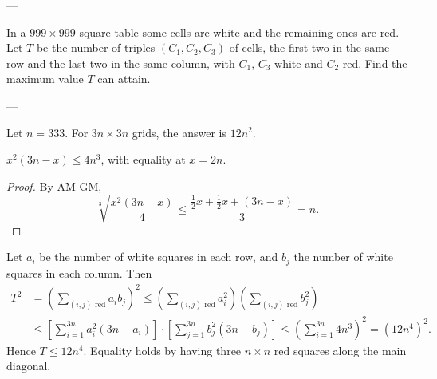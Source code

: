 
---

In a $999\times999$ square table some cells are white and the remaining ones are red. Let $T$ be the number of triples $(C_1,C_2,C_3)$ of cells, the first two in the same row and the last two in the same column, with $C_1$, $C_3$ white and $C_2$ red. Find the maximum value $T$ can attain.

---

Let $n=333$. For $3n\times3n$ grids, the answer is $12n^2$.
\begin{lemma*}
    $x^2(3n-x)\le4n^3$, with equality at $x=2n$.
\end{lemma*}
\begin{proof}
    By AM-GM,
    \[\sqrt[3]{\frac{x^2(3n-x)}4}\le\frac{\frac12x+\frac12x+(3n-x)}3=n.\]
\end{proof}

Let $a_i$ be the number of white squares in each row, and $b_j$ the number of white squares in each column.  Then
\begin{align*}
    T^2&=\left(\sum_{(i,j)\text{ red}}a_ib_j\right)^2
    \le\left(\sum_{(i,j)\text{ red}}a_i^2\right)\left(\sum_{(i,j)\text{ red}}b_j^2\right)\\
    &\le\left[\sum_{i=1}^{3n}a_i^2(3n-a_i)\right]\cdot\left[\sum_{j=1}^{3n}b_j^2(3n-b_j)\right]
    \le\left(\sum_{i=1}^{3n}4n^3\right)^2=\left(12n^4\right)^2.
\end{align*}
Hence $T\le12n^4$. Equality holds by having three $n\times n$ red squares along the main diagonal.

